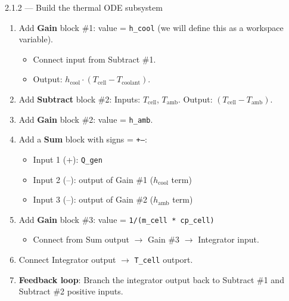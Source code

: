 \documentclass[11pt,a4paper]{article}
\begin{document}
\begin{guistep}{2.1.2 — Build the thermal ODE subsystem}
\begin{enumerate}
\begin{enumerate}[label=\alph*)]
        \item Add \textbf{Gain} block \#1: value = \texttt{h\_cool} (we will define this as a workspace variable).
        \begin{itemize}
            \item Connect input from Subtract \#1.
            \item Output: $h_\text{cool} \cdot (T_\text{cell} - T_\text{coolant})$.
        \end{itemize}

        \item Add \textbf{Subtract} block \#2: Inputs: $T_\text{cell}$, $T_\text{amb}$. Output: $(T_\text{cell} - T_\text{amb})$.

        \item Add \textbf{Gain} block \#2: value = \texttt{h\_amb}.

        \item Add a \textbf{Sum} block with signs = \texttt{+--}:
        \begin{itemize}
            \item Input 1 (+): \texttt{Q\_gen}
            \item Input 2 (--): output of Gain \#1 ($h_\text{cool}$ term)
            \item Input 3 (--): output of Gain \#2 ($h_\text{amb}$ term)
        \end{itemize}

        \item Add \textbf{Gain} block \#3: value = \texttt{1/(m\_cell * cp\_cell)}
        \begin{itemize}
            \item Connect from Sum output $\to$ Gain \#3 $\to$ Integrator input.
        \end{itemize}

        \item Connect Integrator output $\to$ \texttt{T\_cell} outport.

        \item \textbf{Feedback loop}: Branch the integrator output back to Subtract \#1 and Subtract \#2 positive inputs.
    \end{enumerate}
\end{enumerate}
\end{guistep}
\end{document}
